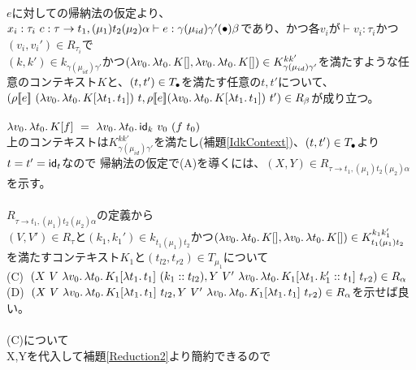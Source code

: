 \documentclass[japanese,draft]{jssst_ppl} %
\begin{document}
\\
$e$に対しての帰納法の仮定より、\\
$x_i:\tau_i\ c:\tau \rightarrow t_1, (\mu_1) t_2 (\mu_2) \alpha \vdash e : \gamma (\mu_{id}) \gamma' (\bullet) \beta$であり、かつ各$v_i$が$\vdash v_i:\tau_i$かつ$(v_i,v_i') \in R_{\tau_i}$で\\
$(k,k')\in k_{\gamma (\mu_{id}) \gamma'}$かつ$(\lambda{v_0}.\,{\lambda{t_0}.\,{K[]}}, \lambda{v_0}.\,{\lambda{t_0}.\,{K[]}})\in  K^{kk'}_{\gamma (\mu_{id}) \gamma'}$を満たすような任意のコンテキスト$K$と、$(t, t') \in T_{\bullet}$を満たす任意の$t, t'$について、\\
$(\rho \CPSTh{e}\ \LamP{v_0}{\Lam{t_0}{K[\Lam{t_1}{t_1}]}}\ t, \rho \CPSTh{e} \LamP{v_0}{\Lam{t_0}{K[\Lam{t_1}{t_1}]}}\ t')\in R_{\beta}$が成り立つ。\\
\\
$\Lam{v_0}{\Lam{t_0}{K[f]}}\ =\ \Lam{v_0}{\Lam{t_0}{\Idk\ v_0\ (f\ t_0)}}$\\
上のコンテキストは$K^{kk'}_{\gamma (\mu_{id}) \gamma'}$を満たし(補題\ref{IdkContext})、$(t, t') \in T_{\bullet}$より$t=t'=\textsf{id}_t$なので
帰納法の仮定で(A)を導くには、$(X,Y)\in R_{\tau \rightarrow t_1, (\mu_1) t_2 (\mu_2) \alpha}$を示す。\\
\\
$R_{\tau \rightarrow t_1, (\mu_1) t_2 (\mu_2) \alpha}$の定義から\\
$(V,V')\in R_{\tau}$と$(k_1,k_1')\in k_{t_1 (\mu_1) t_2}$かつ$(\lambda{v_0}.\,{\lambda{t_0}.\,{K[]}}, \lambda{v_0}.\,{\lambda{t_0}.\,{K[]}})\in K^{k_1k_1'}_{t_1 (\mu_1) t_2}$を満たすコンテキスト$K_1$と$(t_{l2},t_{r2})\in T_{\mu_1}$について\\
(C)\ $(X\ V\ \Lam{v_0}{\Lam{t_0}{K_1[\Lam{t_1}{t_1}]}}\ \ConsP{k_1}{t_{l2}},Y\ V'\ \Lam{v_0}{\Lam{t_0}{K_1[\Lam{t_1}{\Cons{k_1'}{t_1}}]}}\ t_{r2})\in R_{\alpha}$\\
(D)\ $(X\ V\ \Lam{v_0}{\Lam{t_0}{K_1[\Lam{t_1}{t_1}]}}\ t_{l2},Y\ V'\ \Lam{v_0}{\Lam{t_0}{K_1[\Lam{t_1}{t_1}]}}\ t_{r2})\in R_{\alpha}$を示せば良い。\\
\\
(C)について\\
X,Yを代入して補題\ref{Reduction2}より簡約できるので\\
\end{document}
